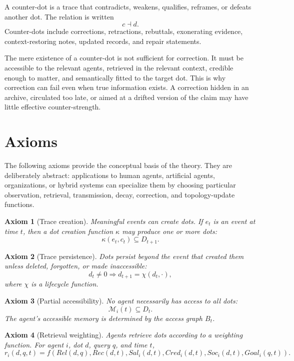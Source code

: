 \documentclass[11pt]{article}
\newtheorem{axiom}{Axiom}
\theoremstyle{remark}
\begin{document}
A counter-dot is a trace that contradicts, weakens, qualifies, reframes, or defeats another dot. The relation is written
\[
c\dashv d.
\]
Counter-dots include corrections, retractions, rebuttals, exonerating evidence, context-restoring notes, updated records, and repair statements.

The mere existence of a counter-dot is not sufficient for correction. It must be accessible to the relevant agents, retrieved in the relevant context, credible enough to matter, and semantically fitted to the target dot. This is why correction can fail even when true information exists. A correction hidden in an archive, circulated too late, or aimed at a drifted version of the claim may have little effective counter-strength.

\section{Axioms}\label{axioms}

The following axioms provide the conceptual basis of the theory. They
are deliberately abstract: applications to human agents, artificial agents,
organizations, or hybrid systems can specialize them by choosing particular
observation, retrieval, transmission, decay, correction, and topology-update
functions.

\begin{axiom}[Trace creation]
Meaningful events can create dots. If $e_t$ is an event at time $t$, then a dot creation function $\kappa$ may produce one or more dots:
$$
\kappa(e_t,c_t) \subseteq D_{t+1}.
$$
\end{axiom}

\begin{axiom}[Trace persistence]
Dots persist beyond the event that created them unless deleted, forgotten, or made inaccessible:
$$
d_t \neq 0 \Rightarrow d_{t+1}=\chi(d_t,\cdot),
$$
where $\chi$ is a lifecycle function.
\end{axiom}

\begin{axiom}[Partial accessibility]
No agent necessarily has access to all dots:
$$
\mathcal M_i(t) \subseteq D_t.
$$
The agent's accessible memory is determined by the access graph $B_t$.
\end{axiom}

\begin{axiom}[Retrieval weighting]
Agents retrieve dots according to a weighting function. For agent $i$, dot $d$, query $q$, and time $t$,
$$
r_i(d,q,t)=f(Rel(d,q),Rec(d,t),Sal_i(d,t),Cred_i(d,t),Soc_i(d,t),Goal_i(q,t)).
$$
\end{axiom}
\end{document}
